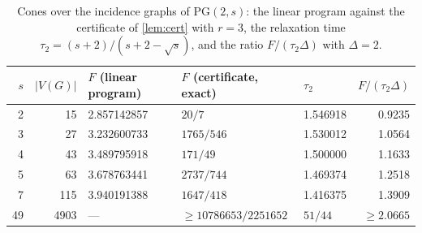 \documentclass[11pt]{amsart}
\theoremstyle{definition}
\newcommand{\PG}{\mathrm{PG}}
\begin{document}
\begin{table}[ht]
\centering
\caption{Cones over the incidence graphs of $\PG(2,s)$: the linear program against the certificate of \cref{lem:cert} with $r=3$, the relaxation time $\tau_2=(s+2)/(s+2-\sqrt s)$, and the ratio $F/(\tau_2\Delta)$ with $\Delta=2$.}\label{tab:pg}
\begin{tabular}{rrlllr}
\toprule
$s$ & $|V(G)|$ & $F$ (linear program) & $F$ (certificate, exact) & $\tau_2$ & $F/(\tau_2\Delta)$\\
\midrule
2 & 15 & 2.857142857 & $20/7$ & 1.546918 & 0.9235\\
3 & 27 & 3.232600733 & $1765/546$ & 1.530012 & 1.0564\\
4 & 43 & 3.489795918 & $171/49$ & 1.500000 & 1.1633\\
5 & 63 & 3.678763441 & $2737/744$ & 1.469374 & 1.2518\\
7 & 115 & 3.940191388 & $1647/418$ & 1.416375 & 1.3909\\
49 & 4903 & --- & $\ge10786653/2251652$ & $51/44$ & $\ge2.0665$\\
\bottomrule
\end{tabular}
\end{table}
\end{document}
